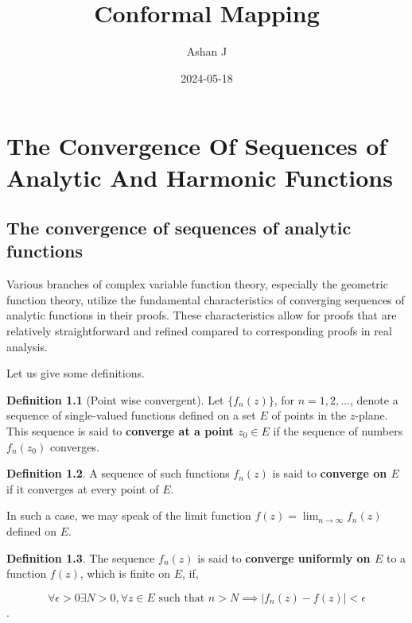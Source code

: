 \documentclass[
]{book}
\title{Conformal Mapping}
\author{Ashan J}
\date{2024-05-18}
\theoremstyle{definition}
\newtheorem{definition}{Definition}[chapter]
\theoremstyle{definition}
\theoremstyle{definition}
\theoremstyle{definition}
\theoremstyle{remark}
\begin{document}
\maketitle

{
\setcounter{tocdepth}{1}
\tableofcontents
}
\chapter{The Convergence Of Sequences of Analytic And Harmonic Functions}\label{the-convergence-of-sequences-of-analytic-and-harmonic-functions}

\section{The convergence of sequences of analytic functions}\label{the-convergence-of-sequences-of-analytic-functions}

Various branches of complex variable function theory, especially the geometric function theory, utilize the fundamental characteristics of converging sequences of analytic functions in their proofs. These characteristics allow for proofs that are relatively straightforward and refined compared to corresponding proofs in real analysis.

Let us give some definitions.

\begin{definition}[Point wise convergent]
\protect\hypertarget{def:unnamed-chunk-1}{}\label{def:unnamed-chunk-1}Let \(\{f_n (z)\}\), for \(n = 1, 2, \ldots\), denote a sequence of single-valued functions defined on a set \(E\) of points in the \(z\)-plane.
This sequence is said to \textbf{converge at a point \(z_0 \in E\)} if the sequence of numbers \(f_n (z_0)\) converges.
\end{definition}

\begin{definition}
\protect\hypertarget{def:unnamed-chunk-2}{}\label{def:unnamed-chunk-2}A sequence of such functions \(f_n (z)\) is said to \textbf{converge on \(E\)} if it converges at every point of \(E\).

In such a case, we may speak of the limit function \(f(z) = \lim_{n\to\infty} f_n (z)\) defined on \(E\).
\end{definition}

\begin{definition}
\protect\hypertarget{def:unnamed-chunk-3}{}\label{def:unnamed-chunk-3}The sequence \({f_n (z)}\) is said to \textbf{converge uniformly on \(E\)} to a function \(f(z)\), which is finite on \(E\), if,

\[\forall \epsilon > 0 \exists N > 0 , \forall z \in E \text{ such that } n > N \implies |f_n (z) - f(z)| < \epsilon \].
\end{definition}
\end{document}
